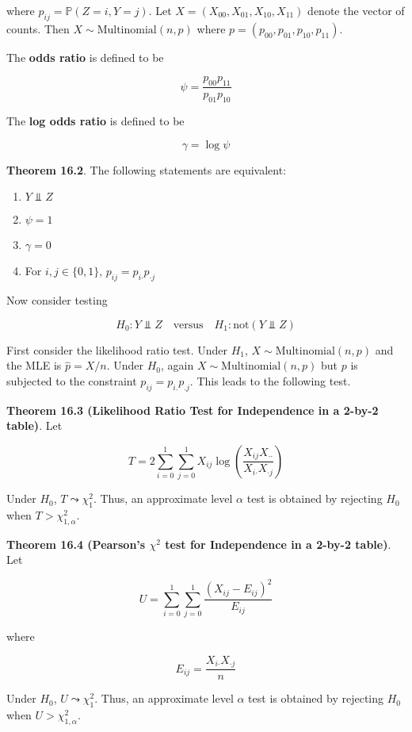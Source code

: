 where \(p_{ij} = \mathbb{P}(Z = i, Y = j)\). Let
\(X = (X_{00}, X_{01}, X_{10}, X_{11})\) denote the vector of counts.
Then \(X \sim \text{Multinomial}(n, p)\) where
\(p = (p_{00}, p_{01}, p_{10}, p_{11})\).

The \textbf{odds ratio} is defined to be

\[ \psi = \frac{p_{00} p_{11}}{p_{01} p_{10}}\]

The \textbf{log odds ratio} is defined to be

\[ \gamma = \log \psi\]

\textbf{Theorem 16.2}. The following statements are equivalent:

\begin{enumerate}[tightlist,label={\arabic*.}]
\item
  \(Y \text{ ⫫ } Z\)
\item
  \(\psi = 1\)
\item
  \(\gamma = 0\)
\item
  For \(i, j \in \{ 0, 1 \}\), \(p_{ij} = p_{i\text{·}} p_{\text{·}j}\)
\end{enumerate}

Now consider testing

\[
H_{0}: Y \text{ ⫫ } Z
\quad \text{versus} \quad
H_{1}: \text{not} (Y \text{ ⫫ } Z)
\]

First consider the likelihood ratio test. Under \(H_{1}\),
\(X \sim \text{Multinomial}(n, p)\) and the MLE is \(\hat{p} = X / n\).
Under \(H_{0}\), again \(X \sim \text{Multinomial}(n, p)\) but \(p\) is
subjected to the constraint \(p_{ij} = p_{i.} p_{.j}\). This leads to
the following test.

\textbf{Theorem 16.3 (Likelihood Ratio Test for Independence in a 2-by-2
table)}. Let

\[ T = 2 \sum_{i=0}^{1} \sum_{j=0}^{1} X_{ij} \log \left( \frac{X_{ij} X_{\text{··}}}{X_{i\text{·}} X_{\text{·}j}} \right)\]

Under \(H_{0}\), \(T \leadsto \chi_{1}^{2}\). Thus, an approximate level
\(\alpha\) test is obtained by rejecting \(H_{0}\) when
\(T > \chi_{1, \alpha}^{2}\).

\textbf{Theorem 16.4 (Pearson's \(\chi^{2}\) test for Independence in a
2-by-2 table)}. Let

\[ U = \sum_{i=0}^{1} \sum_{j=0}^{1} \frac{(X_{ij} - E_{ij})^{2}}{E_{ij}} \]

where

\[ E_{ij} = \frac{X_{i\text{·}} X_{\text{·}j}}{n}\]

Under \(H_{0}\), \(U \leadsto \chi_{1}^{2}\). Thus, an approximate level
\(\alpha\) test is obtained by rejecting \(H_{0}\) when
\(U > \chi_{1, \alpha}^{2}\).

